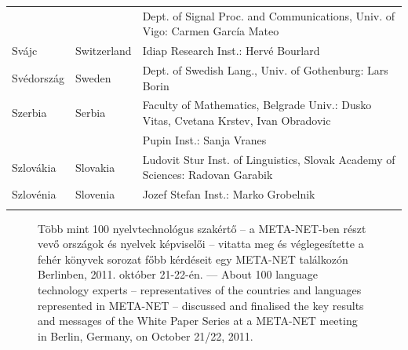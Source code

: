 \begin{longtable}{llp{105mm}}
    & & Dept. of Signal Proc. and Communications, Univ. of Vigo: Carmen García Mateo \\ \addlinespace
    Svájc & \textcolor{grey1}{Switzerland} & Idiap Research Inst.: Hervé Bourlard \\ \addlinespace
    Svédország & \textcolor{grey1}{Sweden} & Dept. of Swedish Lang., Univ. of Gothenburg: Lars Borin \\ \addlinespace 
    Szerbia & \textcolor{grey1}{Serbia} & Faculty of Mathematics, Belgrade Univ.: Dusko Vitas, Cvetana Krstev, Ivan Obradovic \\ \addlinespace
    & & Pupin Inst.: Sanja Vranes \\ \addlinespace  
    Szlovákia & \textcolor{grey1}{Slovakia} & Ludovit Stur Inst. of Linguistics, Slovak Academy of Sciences: Radovan Garabik \\ \addlinespace 
    Szlovénia & \textcolor{grey1}{Slovenia} & Jozef Stefan Inst.: Marko Grobelnik \\ \addlinespace 
  \end{longtable}
  \normalsize

  \renewcommand*{\figureformat}{}
  \renewcommand*{\captionformat}{}

  \begin{figure}[htbp]
    \center
    \caption{Több mint 100 nyelvtechnológus szakértő -- a META-NET-ben részt vevő országok és nyelvek képviselői -- vitatta meg és véglegesítette a fehér könyvek sorozat főbb kérdéseit egy META-NET találkozón Berlinben, 2011. október 21-22-én. --- \textcolor{grey1}{About 100 language technology experts -- representatives of the countries and languages represented in META-NET -- discussed and finalised the key results and messages of the White Paper Series at a META-NET meeting in Berlin, Germany, on October 21/22, 2011.}}
    \medskip
  \end{figure}

  \cleardoublepage

  \label{whitepaperseries}

